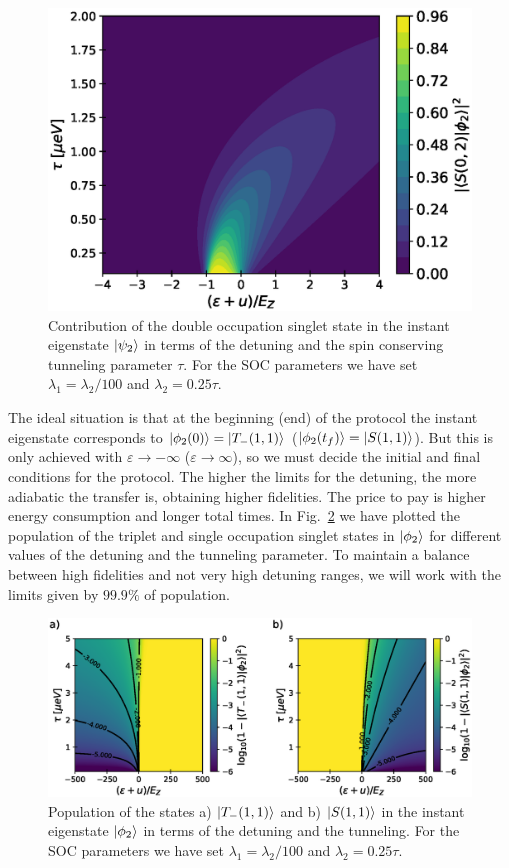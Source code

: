 \documentclass[a4paper,11pt]{article}
\begin{document}
\begin{figure}[!htbp]
	\centering
	\includegraphics[width=0.6\linewidth]{occupation_middle_state.eps}
	\caption{Contribution of the double occupation singlet state in the instant eigenstate $\ket{\psi_2}$ in terms of the detuning and the spin conserving tunneling parameter $\tau$. For the SOC parameters we have set $\lambda_1=\lambda_2/100$ and $\lambda_2=0.25\tau$.}
	\label{fig:occupation_middle_state}
\end{figure}
The ideal situation is that at the beginning (end) of the protocol the instant eigenstate corresponds to $\ket{\phi_2(0)}=\ket{T_-(1,1)}$ ($\ket{\phi_2(t_f)}=\ket{S(1,1)}$). But this is only achieved with $\varepsilon\rightarrow -\infty$ ($\varepsilon\rightarrow \infty$), so we must decide the initial and final conditions for the protocol. The higher the limits for the detuning, the more adiabatic the transfer is, obtaining higher fidelities. The price to pay is higher energy consumption and longer total times. In Fig.~\ref{fig:limits_FAQUAD} we have plotted the population of the triplet and single occupation singlet states in $\ket{\phi_2}$ for different values of the detuning and the tunneling parameter. To maintain a balance between high fidelities and not very high detuning ranges, we will work with the limits given by $99.9\%$ of population. 
\begin{figure}[!htbp]
	\centering
	\includegraphics[width=\linewidth]{limits_FAQUAD.eps}
	\caption{Population of the states a) $\ket{T_-(1,1)}$ and b) $\ket{S(1,1)}$ in the instant eigenstate $\ket{\phi_2}$ in terms of the detuning and the tunneling. For the SOC parameters we have set $\lambda_1=\lambda_2/100$ and $\lambda_2=0.25\tau$.}
	\label{fig:limits_FAQUAD}
\end{figure}
\end{document}
